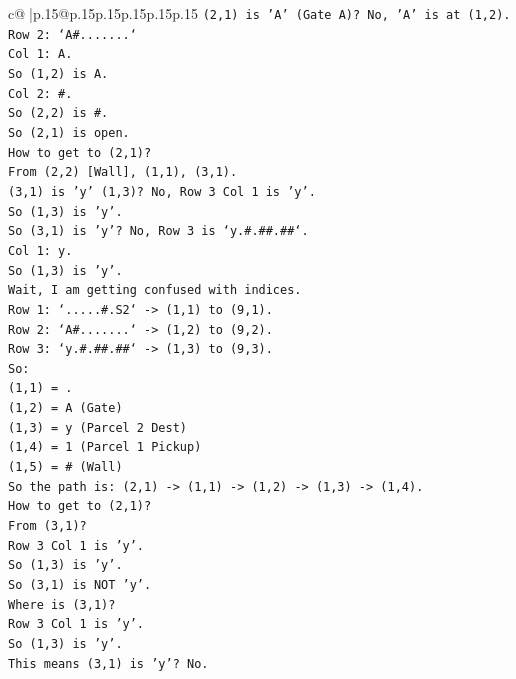 \documentclass{article}
\begin{document}
{\begin{supertabular}{c@{$\;$}|p{.15\linewidth}@{}p{.15\linewidth}p{.15\linewidth}p{.15\linewidth}p{.15\linewidth}p{.15\linewidth}}
{{{\texttt{(2,1) is 'A' (Gate A)? No, 'A' is at (1,2).} \\
\texttt{Row 2: `A\#.......`} \\
\texttt{Col 1: A.} \\
\texttt{So (1,2) is A.} \\
\texttt{Col 2: \#.} \\
\texttt{So (2,2) is \#.} \\
\texttt{So (2,1) is open.} \\
\texttt{How to get to (2,1)?} \\
\texttt{From (2,2) {[}Wall{]}, (1,1), (3,1).} \\
\texttt{(3,1) is 'y' (1,3)? No, Row 3 Col 1 is 'y'.} \\
\texttt{So (1,3) is 'y'.} \\
\texttt{So (3,1) is 'y'? No, Row 3 is `y.\#.\#\#.\#\#`.} \\
\texttt{Col 1: y.} \\
\texttt{So (1,3) is 'y'.} \\
\texttt{Wait, I am getting confused with indices.} \\
\texttt{Row 1: `.....\#.S2` {-}> (1,1) to (9,1).} \\
\texttt{Row 2: `A\#.......` {-}> (1,2) to (9,2).} \\
\texttt{Row 3: `y.\#.\#\#.\#\#` {-}> (1,3) to (9,3).} \\
\texttt{So:} \\
\texttt{(1,1) = .} \\
\texttt{(1,2) = A (Gate)} \\
\texttt{(1,3) = y (Parcel 2 Dest)} \\
\texttt{(1,4) = 1 (Parcel 1 Pickup)} \\
\texttt{(1,5) = \# (Wall)} \\
\texttt{So the path is: (2,1) {-}> (1,1) {-}> (1,2) {-}> (1,3) {-}> (1,4).} \\
\texttt{How to get to (2,1)?} \\
\texttt{From (3,1)?} \\
\texttt{Row 3 Col 1 is 'y'.} \\
\texttt{So (1,3) is 'y'.} \\
\texttt{So (3,1) is NOT 'y'.} \\
\texttt{Where is (3,1)?} \\
\texttt{Row 3 Col 1 is 'y'.} \\
\texttt{So (1,3) is 'y'.} \\
\texttt{This means (3,1) is 'y'? No.} \\
}}}
\end{supertabular}}
\end{document}
